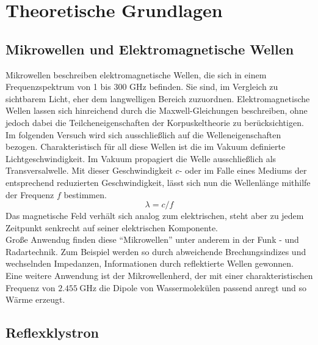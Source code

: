 \section{Theoretische Grundlagen}

\subsection{Mikrowellen und Elektromagnetische Wellen }
Mikrowellen beschreiben elektromagnetische Wellen, die sich in einem Frequenzspektrum von 1 bis 300 $\si{\giga\hertz}$ befinden. 
Sie sind, im Vergleich zu sichtbarem Licht, eher dem langwelligen Bereich zuzuordnen.
Elektromagnetische Wellen lassen sich hinreichend durch die Maxwell-Gleichungen beschreiben, ohne jedoch dabei die Teilcheneigenschaften der Korpuskeltheorie zu berücksichtigen. Im folgenden Versuch wird sich ausschließlich auf die Welleneigenschaften bezogen.
Charakteristisch für all diese Wellen ist die im Vakuum definierte Lichtgeschwindigkeit. Im Vakuum propagiert die Welle ausschließlich als Transversalwelle.
Mit dieser Geschwindigkeit $c$- oder im Falle eines Mediums der entsprechend reduzierten Geschwindigkeit, lässt sich nun die Wellenlänge mithilfe der Frequenz $f$ bestimmen.
\begin{equation}
    \label{eqn:1}
\lambda = c/f
\end{equation}
Das magnetische Feld verhält sich analog zum elektrischen, steht aber zu jedem Zeitpunkt senkrecht auf seiner elektrischen Komponente. \\
\newline
Große Anwendug finden diese \enquote{Mikrowellen} unter anderem in der Funk - und Radartechnik. Zum Beispiel werden so durch abweichende Brechungsindizes und wechselnden Impedanzen,  Informationen durch reflektierte Wellen gewonnen. 
Eine weitere Anwendung ist der Mikrowellenherd, der mit einer charakteristischen Frequenz von $\SI{2.455}{\giga\hertz}$ die Dipole von Wassermolekülen passend anregt und so Wärme erzeugt.

\subsection{Reflexklystron}

